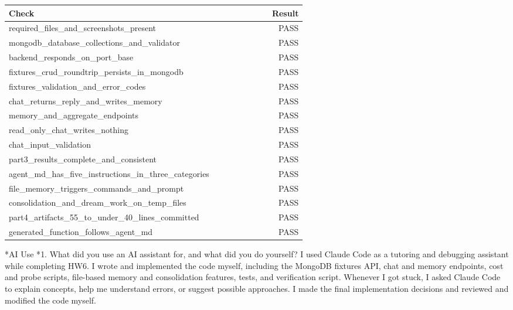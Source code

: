 \documentclass[11pt]{article}
\makeatletter
\renewcommand\section{\@startsection{section}{1}{\z@}{-3.0ex \@plus -1ex \@minus -.2ex}{1.2ex \@plus.2ex}{\normalfont\fontsize{14}{17}\selectfont\bfseries}}
\renewcommand\subsection{\@startsection{subsection}{2}{\z@}{-2.2ex \@plus -1ex \@minus -.2ex}{0.8ex \@plus.2ex}{\normalfont\fontsize{12}{14.5}\selectfont\bfseries}}
\makeatother
\begin{document}
\begin{center}
\small\setlength{\tabcolsep}{4pt}
\begin{tabular}{p{0.7\linewidth}r}
\toprule
\textbf{Check} & \textbf{Result} \\
\midrule
required\_files\_and\_screenshots\_present & PASS \\
mongodb\_database\_collections\_and\_validator & PASS \\
backend\_responds\_on\_port\_base & PASS \\
fixtures\_crud\_roundtrip\_persists\_in\_mongodb & PASS \\
fixtures\_validation\_and\_error\_codes & PASS \\
chat\_returns\_reply\_and\_writes\_memory & PASS \\
memory\_and\_aggregate\_endpoints & PASS \\
read\_only\_chat\_writes\_nothing & PASS \\
chat\_input\_validation & PASS \\
part3\_results\_complete\_and\_consistent & PASS \\
agent\_md\_has\_five\_instructions\_in\_three\_categories & PASS \\
file\_memory\_triggers\_commands\_and\_prompt & PASS \\
consolidation\_and\_dream\_work\_on\_temp\_files & PASS \\
part4\_artifacts\_55\_to\_under\_40\_lines\_committed & PASS \\
generated\_function\_follows\_agent\_md & PASS \\
\bottomrule
\end{tabular}
\end{center}
\section*{AI Use}
\subsection*{1. What did you use an AI assistant for, and what did you do yourself?}
I used Claude Code as a tutoring and debugging assistant while completing HW6. I wrote and implemented the code myself, including the MongoDB fixtures API, chat and memory endpoints, cost and probe scripts, file-based memory and consolidation features, tests, and verification script. Whenever I got stuck, I asked Claude Code to explain concepts, help me understand errors, or suggest possible approaches. I made the final implementation decisions and reviewed and modified the code myself.
\end{document}
